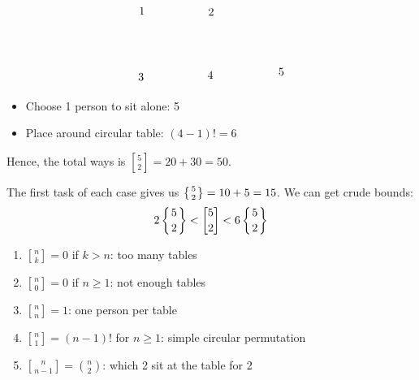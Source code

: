 \documentclass[12pt]{article}
\begin{document}
\begin{itemize}[align=left]
\[\begin{tikzpicture}[x=0.75pt,y=0.75pt,yscale=-1,xscale=1]
        \draw (90,99.4) node [anchor=north west][inner sep=0.75pt]    {$1$};
        \draw (171,100.4) node [anchor=north west][inner sep=0.75pt]    {$2$};
        \draw (89,176.4) node [anchor=north west][inner sep=0.75pt]    {$3$};
        \draw (170,174.4) node [anchor=north west][inner sep=0.75pt]    {$4$};
        \draw (253,170.4) node [anchor=north west][inner sep=0.75pt]    {$5$};
        
        
        \end{tikzpicture}
        \]
        \begin{itemize}
            \item Choose 1 person to sit alone: 5
            \item Place around circular table: $(4-1)!=6$
        \end{itemize}
\end{itemize}
Hence, the total ways is ${5\brack 2}=20+30=50$.

\rmk The first task of each case gives us $\left\{{5 \atop 2}\right\}=10+5=15$. We can get crude bounds: \[2\left\{{5 \atop 2}\right\}<{5\brack 2}<6\left\{{5 \atop 2}\right\}\]

\begin{proposition}\hfill
    \begin{enumerate}
        \item \({n\brack k}=0\) if $k>n$: too many tables
        \item \({n\brack 0}=0\) if $n\geq 1$: not enough tables
        \item \({n\brack n}=1\): one person per table
        \item \({n\brack 1}=(n-1)!\) for $n\geq 1$: simple circular permutation
        \item \({n\brack n-1}={n\choose 2}\): which 2 sit at the table for 2
    \end{enumerate}
\end{proposition}
\end{document}
